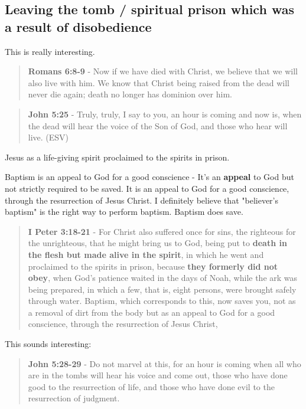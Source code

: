 \documentclass[11pt]{article}
\begin{document}
\subsection{Leaving the tomb / spiritual prison which was a result of disobedience}
\label{sec:org9075b62}
This is really interesting.

\begin{quote}
\textbf{Romans 6:8-9} - Now if we have died with Christ, we believe that we will also live with him. We know that Christ being raised from the dead will never die again; death no longer has dominion over him.
\end{quote}

\begin{quote}
\textbf{John 5:25} - Truly, truly, I say to you, an hour is coming and now is, when the dead will hear the voice of the Son of God, and those who hear will live. (ESV)
\end{quote}

Jesus as a life-giving spirit proclaimed to the spirits in prison.

Baptism is an appeal to God for a good conscience - It's an \textbf{appeal} to God but not strictly required to be saved.
It is an appeal to God for a good conscience, through the resurrection of Jesus Christ.
I definitely believe that "believer's baptism" is the right way to perform baptism.
Baptism does save.

\begin{quote}
\textbf{I Peter 3:18-21} - For Christ also suffered once for sins, the righteous for the unrighteous, that he might bring us to God, being put to \textbf{death in the flesh but made alive in the spirit}, in which he went and proclaimed to the spirits in prison, because \textbf{they formerly did not obey}, when God's patience waited in the days of Noah, while the ark was being prepared, in which a few, that is, eight persons, were brought safely through water. Baptism, which corresponds to this, now saves you, not as a removal of dirt from the body but as an appeal to God for a good conscience, through the resurrection of Jesus Christ,
\end{quote}

This sounds interesting:

\begin{quote}
\textbf{John 5:28-29} - Do not marvel at this, for an hour is coming when all who are in the tombs will hear his voice and come out, those who have done good to the resurrection of life, and those who have done evil to the resurrection of judgment.
\end{quote}
\end{document}
